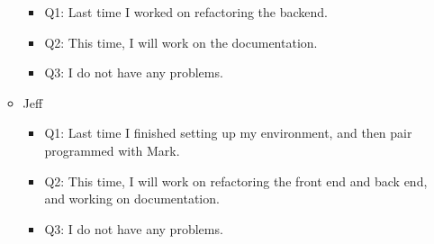 \documentclass[]{article}
\begin{document}
\begin{itemize}
\begin{itemize}
    \begin{itemize}
    \itemsep1pt\parskip0pt
    \item
      Q1: Last time I worked on refactoring the backend.
    \item
      Q2: This time, I will work on the documentation.
    \item
      Q3: I do not have any problems.
    \end{itemize}
  \item
    Jeff

    \begin{itemize}
    \itemsep1pt\parskip0pt
    \item
      Q1: Last time I finished setting up my environment, and then pair
      programmed with Mark.
    \item
      Q2: This time, I will work on refactoring the front end and back
      end, and working on documentation.
    \item
      Q3: I do not have any problems.
    \end{itemize}
  \end{itemize}
\end{itemize}
\end{document}
